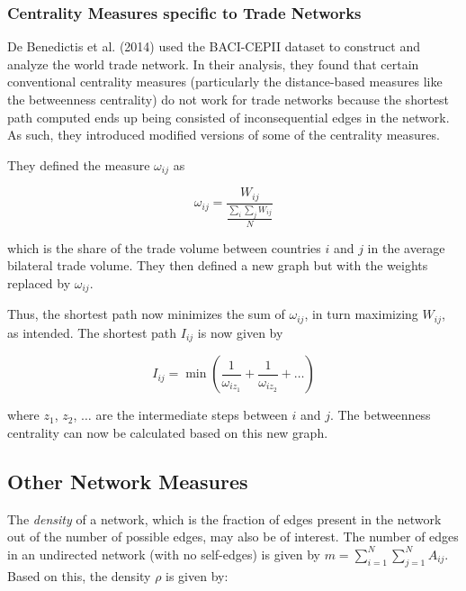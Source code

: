 \documentclass[12pt,letterpaper]{report}
\begin{document}
	\subsubsection{Centrality Measures specific to Trade Networks}
	\label{ssec:313CentralityTrade}
	
	De Benedictis et al. (2014) used the BACI-CEPII dataset to construct and analyze the world trade network. In their analysis, they found that certain conventional centrality measures (particularly the distance-based measures like the betweenness centrality) do not work for trade networks because the shortest path computed ends up being consisted of inconsequential edges in the network. As such, they introduced modified versions of some of the centrality measures.

	They defined the measure $\omega_{ij}$ as
	
	\begin{equation}
	\label{eqn:315weightTrade} \omega_{ij} = \frac{W_{ij}}{\frac{\sum_{i} \sum_{j} W_{ij}}{N}} \end{equation}
	
	which is the share of the trade volume between countries $i$ and $j$ in the average bilateral trade volume. They then defined a new graph but with the weights replaced by $\omega_{ij}$.
	
	Thus, the shortest path now minimizes the sum of $\omega_{ij}$, in turn maximizing $W_{ij}$, as intended. The shortest path $I_{ij}$ is now given by
	
	\begin{equation}
	\label{eqn:316shortestPathTrade} I_{ij} = \min{\left( \frac{1}{\omega_{iz_{1}}} + \frac{1}{\omega_{iz_{2}}} + \ldots \right)} \end{equation}
	
	where $z_1$, $z_2$, $\ldots$ are the intermediate steps between $i$ and $j$. The betweenness centrality can now be calculated based on this new graph.
	
	\subsection{Other Network Measures}
	\label{ssec:32OtherMeasures}
	
	The \textit{density} of a network, which is the fraction of edges present in the network out of the number of possible edges, may also be of interest. The number of edges in an undirected network (with no self-edges) is given by $m = \sum_{i = 1}^{N}\sum_{j = 1}^{N} A_{ij}$. Based on this, the density $\rho$ is given by:
	
\end{document}
